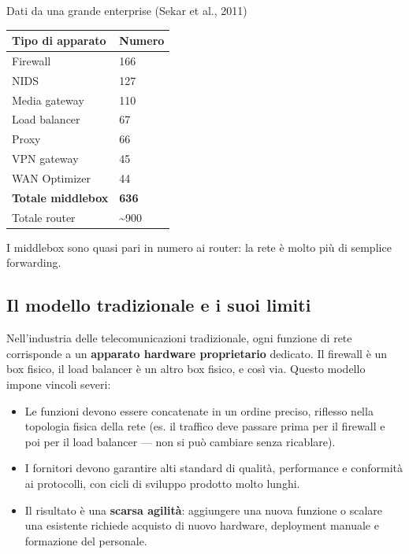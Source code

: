 \documentclass[
  italian,
  openany]{book}
\newcounter{none} %
\providecommand{\tightlist}{%
  \setlength{\itemsep}{0pt}\setlength{\parskip}{0pt}}
\begin{document}
\begin{callouttip}{Dati da una grande enterprise (Sekar et al., 2011)}

{\def\LTcaptype{none} %
\begin{longtable}[]{@{}ll@{}}
\toprule\noalign{}
Tipo di apparato & Numero \\
\midrule\noalign{}
\endhead
\bottomrule\noalign{}
\endlastfoot
Firewall & 166 \\
NIDS & 127 \\
Media gateway & 110 \\
Load balancer & 67 \\
Proxy & 66 \\
VPN gateway & 45 \\
WAN Optimizer & 44 \\
\textbf{Totale middlebox} & \textbf{636} \\
Totale router & \textasciitilde900 \\
\end{longtable}
}

I middlebox sono quasi pari in numero ai router: la rete è molto più di
semplice forwarding.

\end{callouttip}

\subsection{Il modello tradizionale e i suoi
limiti}\label{il-modello-tradizionale-e-i-suoi-limiti}

Nell'industria delle telecomunicazioni tradizionale, ogni funzione di
rete corrisponde a un \textbf{apparato hardware proprietario} dedicato.
Il firewall è un box fisico, il load balancer è un altro box fisico, e
così via. Questo modello impone vincoli severi:

\begin{itemize}
\tightlist
\item
  Le funzioni devono essere concatenate in un ordine preciso, riflesso
  nella topologia fisica della rete (es. il traffico deve passare prima
  per il firewall e poi per il load balancer --- non si può cambiare
  senza ricablare).
\item
  I fornitori devono garantire alti standard di qualità, performance e
  conformità ai protocolli, con cicli di sviluppo prodotto molto lunghi.
\item
  Il risultato è una \textbf{scarsa agilità}: aggiungere una nuova
  funzione o scalare una esistente richiede acquisto di nuovo hardware,
  deployment manuale e formazione del personale.
\end{itemize}
\end{document}
